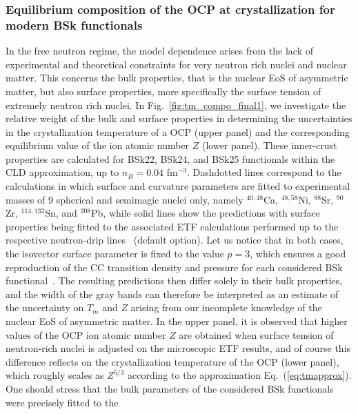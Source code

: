 \subsubsection{Equilibrium composition of the OCP at crystallization for modern 
BSk functionals}\label{subsubsec:cryst_bsk}

In the free neutron regime, the model dependence arises from the lack of 
experimental and theoretical constraints for very neutron rich nuclei and 
nuclear matter. 
This concerns the bulk properties, that is the nuclear EoS of asymmetric 
matter, but also surface properties, more specifically the surface tension of 
extremely neutron rich nuclei. 
In Fig.~\ref{fig:tm_compo_final1}, we investigate the relative 
weight of the bulk and surface properties in determining the uncertainties in 
the crystallization temperature of a OCP (upper panel) and the corresponding 
equilibrium value of the ion atomic number $Z$ (lower panel).
These inner-crust properties are calculated for BSk22, BSk24, and BSk25
functionals within the CLD approximation, up to $n_B = 0.04$ fm$^{-3}$. 
Dashdotted lines correspond to 
the calculations in which surface and curvature parameters are fitted to 
experimental masses of 9 spherical and semimagic nuclei only, namely 
$^{40,48}$Ca, $^{48,58}$Ni, $^{88}$Sr, $^{90}$Zr, $^{114,132}$Sn, and 
$^{208}$Pb, while solid lines show the predictions with surface properties 
being fitted to the associated ETF calculations performed up to the 
respective neutron-drip lines~\cite{PearsonPriv} (default option). 
Let us notice that in both 
cases, the isovector surface parameter is fixed to the value $p=3$, which 
ensures a good reproduction of the CC transition density and pressure for each 
considered BSk functional~\cite{Carreau2019}.
The resulting predictions then differ solely in their bulk properties, and the
width of the gray bands can therefore be interpreted as an estimate of the 
uncertainty on $T_m$ and $Z$ arising from our incomplete knowledge of the 
nuclear EoS of asymmetric matter.
In the upper panel, it is observed that higher values of the OCP ion atomic 
number $Z$ are obtained when surface tension of neutron-rich nuclei is adjusted 
on the microscopic ETF results, and of course this difference reflects on the 
crystallization temperature of the OCP (lower panel), which roughly scales as 
$Z^{5/3}$ according to the approximation Eq.~(\ref{eq:tmapprox}).
%
One should stress that the bulk 
parameters of the considered BSk functionals were precisely fitted to the 
